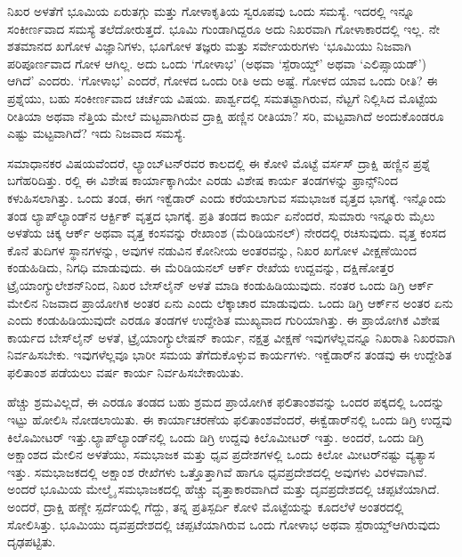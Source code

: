 ನಿಖರ ಅಳತೆಗೆ ಭೂಮಿಯ ಏರುತಗ್ಗು ಮತ್ತು ಗೋಳಾಕೃತಿಯ ಸ್ವರೂಪವು ಒಂದು ಸಮಸ್ಯೆ. ಇದರಲ್ಲಿ ಇನ್ನೂ ಸಂಕೀರ್ಣವಾದ ಸಮಸ್ಯೆ ತಲೆದೋರುತ್ತದೆ. ಭೂಮಿ ಗುಂಡಾಗಿದ್ದರೂ ಅದು ನಿಖರವಾಗಿ ಗೋಳಾಕಾರದಲ್ಲಿ ಇಲ್ಲ. ನೇ ಶತಮಾನದ ಖಗೋಳ ವಿಜ್ಞಾನಿಗಳು, ಭೂಗೋಳ ತಜ್ಞರು ಮತ್ತು ಸರ್ವೇಯರುಗಳು ‘ಭೂಮಿಯು ನಿಜವಾಗಿ ಪರಿಪೂರ್ಣವಾದ ಗೋಳ ಆಗಿಲ್ಲ. ಅದು ಒಂದು ‘ಗೋಳಾಭ’ (ಅಥವಾ ‘ಸ್ಪೆರಾಯ್ಡ್​’ ಅಥವಾ ‘ಎಲಿಪ್ಸಾಯಡ್​’) ಆಗಿದೆ’ ಎಂದರು. ‘ಗೋಳಾಭ’ ಎಂದರೆ, ಗೋಳದ ಒಂದು ರೀತಿ ಅದು ಅಷ್ಟೆ. ಗೋಳದ ಯಾವ ಒಂದು ರೀತಿ? ಈ ಪ್ರಶ್ನೆಯು, ಬಹು ಸಂಕೀರ್ಣವಾದ ಚರ್ಚೆಯ ವಿಷಯ. ಪಾರ್ಶ್ವದಲ್ಲಿ ಸಮತಟ್ಟಾಗಿರುವ, ನೆಟ್ಟಗೆ ನಿಲ್ಲಿಸಿದ ಮೊಟ್ಟೆಯ ರೀತಿಯಾ ಅಥವಾ ನೆತ್ತಿಯ ಮೇಲೆ ಮಟ್ಟವಾಗಿರುವ ದ್ರಾಕ್ಷಿ ಹಣ್ಣಿನ ರೀತಿಯಾ? ಸರಿ, ಮಟ್ಟವಾಗಿದೆ ಅಂದುಕೊಂಡರೂ ಎಷ್ಟು ಮಟ್ಟವಾಗಿದೆ? ಇದು ನಿಜವಾದ ಸಮಸ್ಯೆ.

ಸಮಾಧಾನಕರ ವಿಷಯವೆಂದರೆ, ಲ್ಯಾಂಬ್​ಟನ್​ರವರ ಕಾಲದಲ್ಲಿ ಈ ಕೋಳಿ ಮೊಟ್ಟೆ ವರ್ಸಸ್​ ದ್ರಾಕ್ಷಿ ಹಣ್ಣಿನ ಪ್ರಶ್ನೆ ಬಗೆಹರಿದಿತ್ತು. ರಲ್ಲಿ ಈ ವಿಶೇಷ ಕಾರ್ಯಾಕ್ಕಾಗಿಯೇ ಎರಡು ವಿಶೇಷ ಕಾರ್ಯ ತಂಡಗಳನ್ನು ಫ್ರಾನ್ಸ್​ನಿಂದ ಕಳುಹಿಸಲಾಗಿತ್ತು. ಒಂದು ತಂಡ, ಈಗ ಇಕ್ವೆಡಾರ್​ ಎಂದು ಕರೆಯಲಾಗುವ ಸಮಭಾಜಕ ವೃತ್ತದ ಭಾಗಕ್ಕೆ. ಇನ್ನೊಂದು ತಂಡ ಲ್ಯಾಪ್​ಲ್ಯಾಂಡ್​ನ ಆರ್ಕ್ಟಿಕ್​ ವೃತ್ತದ ಭಾಗಕ್ಕೆ. ಪ್ರತಿ ತಂಡದ ಕಾರ್ಯ ಏನೆಂದರೆ, ಸುಮಾರು ಇನ್ನೂರು ಮೈಲು ಅಳತೆಯ ಚಿಕ್ಕ ಆರ್ಕ್ ಅಥವಾ ವೃತ್ತ ಕಂಸವನ್ನು ರೇಖಾಂಶ (ಮೆರಿಡಿಯನಲ್​) ನೇರದಲ್ಲಿ ರಚಿಸುವುದು. ವೃತ್ತ ಕಂಸದ ಕೊನೆ ತುದಿಗಳ ಸ್ಥಾನಗಳನ್ನು, ಅವುಗಳ ನಡುವಿನ ಕೋನೀಯ ಅಂತರವನ್ನು, ನಿಖರ ಖಗೋಳ ವೀಕ್ಷಣೆಯಿಂದ ಕಂಡುಹಿಡಿದು, ನಿಗಧಿ ಮಾಡುವುದು. ಈ ಮೆರಿಡಿಯನಲ್​ ಆರ್ಕ್ ರೇಖೆಯ ಉದ್ದವನ್ನು, ದಕ್ಷಿಣೋತ್ತರ ಟ್ರೈಯಾಂಗ್ಯುಲೇಶನ್​ನಿಂದ, ನಿಖರ ಬೇಸ್​ಲೈನ್​ ಅಳತೆ ಮಾಡಿ ಕಂಡುಹಿಡಿಯುವುದು. ನಂತರ ಒಂದು ಡಿಗ್ರಿ ಆರ್ಕ್ ಮೇಲಿನ ನಿಜವಾದ ಪ್ರಾಯೋಗಿಕ ಅಂತರ ಏನು ಎಂದು ಲೆಕ್ಕಾಚಾರ ಮಾಡುವುದು. ಒಂದು ಡಿಗ್ರಿ ಆರ್ಕ್‌ನ ಅಂತರ ಏನು ಎಂದು ಕಂಡುಹಿಡಿಯುವುದೇ ಎರಡೂ ತಂಡಗಳ ಉದ್ದೇಶಿತ ಮುಖ್ಯವಾದ ಗುರಿಯಾಗಿತ್ತು. ಈ ಪ್ರಾಯೋಗಿಕ ವಿಶೇಷ ಕಾರ್ಯದ ಬೇಸ್‌ಲೈನ್​ ಅಳತೆ, ಟ್ರೈಯಾಂಗ್ಯುಲೇಷನ್​ ಕಾರ್ಯ, ನಕ್ಷತ್ರ ವೀಕ್ಷಣೆ ಇವುಗಳೆಲ್ಲವನ್ನೂ ನಿಖರಾತಿ ನಿಖರವಾಗಿ ನಿರ್ವಹಿಸಬೇಕು. ಇವುಗಳೆಲ್ಲವೂ ಭಾರೀ ಸಮಯ ತೆಗೆದುಕೊಳ್ಳುವ ಕಾರ್ಯಗಳು. ಇಕ್ವೆಡಾರ್​ನ ತಂಡವು ಈ ಉದ್ದೇಶಿತ ಫಲಿತಾಂಶ ಪಡೆಯಲು  ವರ್ಷ ಕಾರ್ಯ ನಿರ್ವಹಿಸಬೇಕಾಯಿತು.

ಹೆಚ್ಚು ಶ್ರಮವಿಲ್ಲದೆ, ಈ ಎರಡೂ ತಂಡದ ಬಹು ಶ್ರಮದ ಪ್ರಾಯೋಗಿಕ ಫಲಿತಾಂಶವನ್ನು ಒಂದರ ಪಕ್ಕದಲ್ಲಿ ಒಂದನ್ನು ಇಟ್ಟು ಹೋಲಿಸಿ ನೋಡಲಾಯಿತು. ಈ ಕಾರ್ಯಾಚರಣೆಯ ಫಲಿತಾಂಶವೆಂದರೆ, ಈಕ್ವೆಡಾರ್​ನಲ್ಲಿ ಒಂದು ಡಿಗ್ರಿ ಉದ್ದವು  ಕಿಲೊಮೀಟರ್​ ಇತ್ತು.\break ಲ್ಯಾಪ್​ಲ್ಯಾಂಡ್​ನಲ್ಲಿ ಒಂದು ಡಿಗ್ರಿ ಉದ್ದವು  ಕಿಲೊಮೀಟರ್​ ಇತ್ತು. ಅಂದರೆ, ಒಂದು ಡಿಗ್ರಿ ಅಕ್ಷಾಂಶದ ಮೇಲಿನ ಅಳತೆಯು, ಸಮಭಾಜಕ ಮತ್ತು ಧೃವ ಪ್ರದೇಶಗಳಲ್ಲಿ ಒಂದು ಕಿಲೋ ಮೀಟರ್​ನಷ್ಟು ವ್ಯತ್ಯಾಸ ಇತ್ತು. ಸಮಭಾಜಕದಲ್ಲಿ ಅಕ್ಷಾಂಶ ರೇಖೆಗಳು ಒತ್ತೊತ್ತಾಗಿವೆ ಹಾಗೂ ಧೃವಪ್ರದೇಶದಲ್ಲಿ ಅವುಗಳು ವಿರಳವಾಗಿವೆ. ಅಂದರೆ ಭೂಮಿಯ ಮೇಲ್ಮೈ ಸಮಭಾಜಕದಲ್ಲಿ ಹೆಚ್ಚು ವೃತ್ತಾಕಾರವಾಗಿದೆ ಮತ್ತು ದೃವಪ್ರದೇಶದಲ್ಲಿ ಚಪ್ಪಟೆಯಾಗಿದೆ. ಅಂದರೆ, ದ್ರಾಕ್ಷಿ ಹಣ್ಣೇ ಸ್ಪರ್ದೆಯಲ್ಲಿ ಗೆದ್ದು, ತನ್ನ ಪ್ರತಿಸ್ಪರ್ದಿ ಕೋಳಿ ಮೊಟ್ಟೆಯನ್ನು ಕೂದಲೆಳೆ ಅಂತರದಲ್ಲಿ ಸೋಲಿಸಿತ್ತು. ಭೂಮಿಯು ದೃವಪ್ರದೇಶದಲ್ಲಿ ಚಪ್ಪಟೆಯಾಗಿರುವ ಒಂದು ಗೋಳಾಭ ಅಥವಾ ಸ್ಪೆರಾಯ್ಡ್​ ಆಗಿರುವುದು ದೃಢಪಟ್ಟಿತು.

